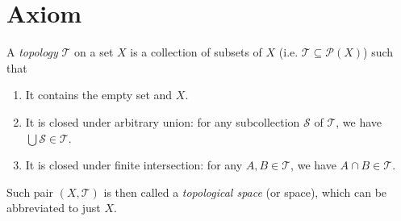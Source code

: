 \documentclass{treatise}
\begin{document}
\section{Axiom}
A \emph{topology} $\mathcal{T}$ on a set $X$ is a collection of subsets of $X$ (i.e. $\mathcal{T} \subseteq \mathcal{P}(X)$) such that
\begin{enumerate}
    \item It contains the empty set and $X$.
    \item It is closed under arbitrary union: for any subcollection $\mathcal{S}$ of $\mathcal{T}$, we have $\bigcup \mathcal{S} \in \mathcal{T}$.
    \item It is closed under finite intersection: for any $A, B \in \mathcal{T}$, we have $A \cap B \in \mathcal{T}$.
\end{enumerate}
Such pair $(X, \mathcal{T})$ is then called a \emph{topological space} (or space), which can be abbreviated to just $X$.
\end{document}
